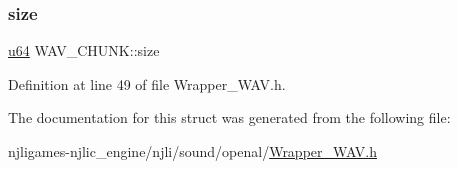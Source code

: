 \mbox{\label{struct_w_a_v___c_h_u_n_k_a202ff2b47df8f3e2bbae459b4e3180fd}} 
\subsubsection{\texorpdfstring{size}{size}}
{\footnotesize\ttfamily \mbox{\hyperlink{_util_8h_ad758b7a5c3f18ed79d2fcd23d9f16357}{u64}} W\+A\+V\+\_\+\+C\+H\+U\+N\+K\+::size}



Definition at line 49 of file Wrapper\+\_\+\+W\+A\+V.\+h.



The documentation for this struct was generated from the following file\+:\begin{DoxyCompactItemize}
\item 
njligames-\/njlic\+\_\+engine/njli/sound/openal/\mbox{\hyperlink{_wrapper___w_a_v_8h}{Wrapper\+\_\+\+W\+A\+V.\+h}}\end{DoxyCompactItemize}
